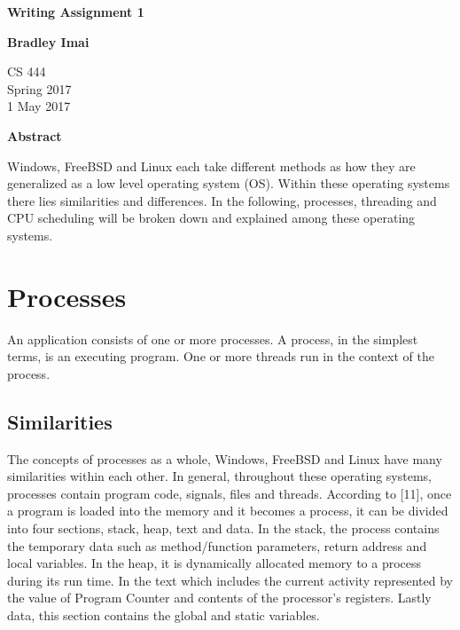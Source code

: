 \documentclass[letterpaper,10pt,titlepage]{article}
\begin{document}
\begin{titlepage}
    \begin{center}
        \vspace*{3.5cm}

        \textbf{Writing Assignment 1}

        \vspace{0.5cm}

        \textbf{Bradley Imai}

        \vspace{0.8cm}

        CS 444\\
        Spring 2017\\
        1 May 2017\\

        \vspace{1cm}

        \textbf{Abstract}\\

        \vspace{0.5cm}

  Windows, FreeBSD and Linux each take different methods as how they are generalized as a low level operating system (OS). Within these operating systems there lies similarities and differences. In the following, processes, threading and CPU scheduling will be broken down and explained among these operating systems.

        \vfill

    \end{center}
\end{titlepage}


\section{Processes}

An application consists of one or more processes. A process, in the simplest terms, is an executing program. One or more threads run in the context of the process.


\subsection{Similarities}

The concepts of processes as a whole, Windows, FreeBSD and Linux have many similarities within each other. In general, throughout these operating systems, processes contain program code, signals, files and threads. According to [11], once a program is loaded into the memory and it becomes a process, it can be divided into four sections, stack, heap, text and data. In the stack, the process contains the temporary data such as method/function parameters, return address and local variables. In the heap, it is dynamically allocated memory to a process during its run time. In the text which includes the current activity represented by the value of Program Counter and contents of the processor’s registers. Lastly data, this section contains the global and static variables.
\end{document}
